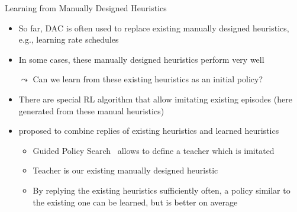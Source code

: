 \begin{frame}[c]{Learning from Manually Designed Heuristics}

	\begin{itemize}
	    \item So far, DAC is often used to replace existing manually designed heuristics,\\ e.g., learning rate schedules 
	    \item In some cases, these manually designed heuristics perform very well
	    \item[$\leadsto$] Can we learn from these existing heuristics as an initial policy?
	    \pause
	    \medskip
	    \item There are special RL algorithm that allow imitating existing episodes (here generated from these manual heuristics)
	    \item {} proposed to combine replies of existing heuristics and learned heuristics 
	    \begin{itemize}
	        \item Guided Policy Search~ allows to define a teacher which is imitated
	        \item Teacher is our existing manually designed heuristic
	        \item By replying the existing heuristics sufficiently often, a policy similar to the existing one can be learned, but is better on average
	    \end{itemize}
	    
	\end{itemize}	
	
\end{frame}
